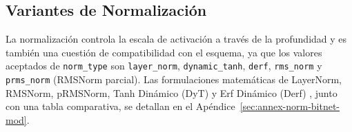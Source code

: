 \subsection{Variantes de Normalización}
\label{sec:normalization}

La normalización controla la escala de activación a través de la profundidad y es también una cuestión de compatibilidad con el esquema, ya que los valores aceptados de \texttt{norm\_type} son \texttt{layer\_norm}, \texttt{dynamic\_tanh}, \texttt{derf}, \texttt{rms\_norm} y \texttt{prms\_norm} (RMSNorm parcial). Las formulaciones matemáticas de LayerNorm, RMSNorm, pRMSNorm, Tanh Dinámico (DyT) \citep{zhu_transformers_2025} y Erf Dinámico (Derf) \citep{chen_stronger_2025}, junto con una tabla comparativa, se detallan en el Apéndice~\ref{sec:annex-norm-bitnet-mod}.

